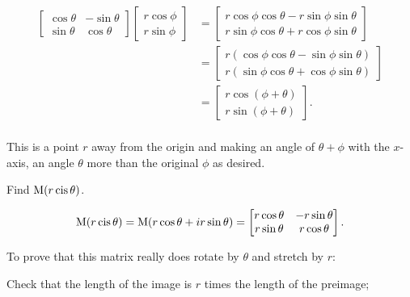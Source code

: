 \documentclass[../gatm_answers.tex]{subfiles}
\begin{document}
\begin{align*}
\begin{bmatrix} \cos\theta & -\sin\theta \\ \sin\theta & \cos\theta \end{bmatrix} \begin{bmatrix}r\cos\phi \\ r\sin\phi \end{bmatrix} &= \begin{bmatrix} r\cos\phi\cos\theta - r\sin\phi\sin\theta \\ r\sin\phi\cos\theta + r\cos\phi\sin\theta \end{bmatrix} \\
&= \begin{bmatrix} r(\cos\phi\cos\theta - \sin\phi\sin\theta) \\ r(\sin\phi\cos\theta + \cos\phi\sin\theta) \end{bmatrix} \\
&= \begin{bmatrix} r\cos(\phi + \theta) \\ r\sin(\phi + \theta) \end{bmatrix}. \\
\end{align*}

This is a point $r$ away from the origin and making an angle of $\theta + \phi$ with the $x$-axis, an angle $\theta$ more than the original $\phi$ as desired.

\begin{outer_problem}
\item 
\end{outer_problem}

\begin{inner_problem}[start=1]
\item Find $\operatorname{M} (r\operatorname{cis}\theta)$.
\end{inner_problem}

$$\operatorname{M} (r\operatorname{cis}\theta) = \operatorname{M}(r\cos\theta + ir\sin\theta) = \begin{bmatrix} r\cos\theta & -r\sin\theta \\ r\sin\theta & r\cos\theta \end{bmatrix}.$$

\begin{inner_problem}
\item To prove that this matrix really does rotate by $\theta$ and stretch by $r$:
\end{inner_problem}

\begin{iinner_problem}[start=1]
\item Check that the length of the image is $r$ times the length of the preimage;
\end{iinner_problem}
\end{document}
